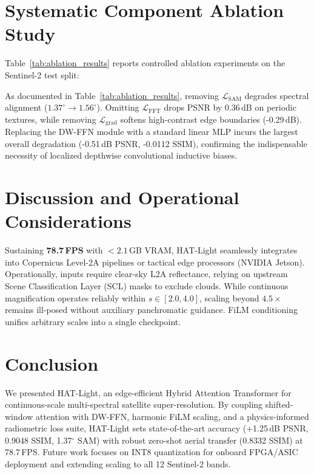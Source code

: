 \documentclass[letterpaper,journal,twoside]{IEEEtran}
\begin{document}
\section{Systematic Component Ablation Study}
Table~\ref{tab:ablation_results} reports controlled ablation experiments on the Sentinel-2 test split:



As documented in Table~\ref{tab:ablation_results}, removing $\mathcal{L}_{\text{SAM}}$ degrades spectral alignment ($1.37^\circ \to 1.56^\circ$). Omitting $\mathcal{L}_{\text{FFT}}$ drops PSNR by 0.36\,dB on periodic textures, while removing $\mathcal{L}_{\text{grad}}$ softens high-contrast edge boundaries (-0.29\,dB). Replacing the DW-FFN module with a standard linear MLP incurs the largest overall degradation (-0.51\,dB PSNR, -0.0112 SSIM), confirming the indispensable necessity of localized depthwise convolutional inductive biases.

\section{Discussion and Operational Considerations}
Sustaining \textbf{78.7\,FPS} with $<2.1$\,GB VRAM, HAT-Light seamlessly integrates into Copernicus Level-2A pipelines or tactical edge processors (NVIDIA Jetson). Operationally, inputs require clear-sky L2A reflectance, relying on upstream Scene Classification Layer (SCL) masks to exclude clouds. While continuous magnification operates reliably within $s \in [2.0, 4.0]$, scaling beyond $4.5\times$ remains ill-posed without auxiliary panchromatic guidance. FiLM conditioning unifies arbitrary scales into a single checkpoint.

\section{Conclusion}
We presented HAT-Light, an edge-efficient Hybrid Attention Transformer for continuous-scale multi-spectral satellite super-resolution. By coupling shifted-window attention with DW-FFN, harmonic FiLM scaling, and a physics-informed radiometric loss suite, HAT-Light sets state-of-the-art accuracy (+1.25\,dB PSNR, 0.9048 SSIM, 1.37$^\circ$ SAM) with robust zero-shot aerial transfer (0.8332 SSIM) at 78.7\,FPS. Future work focuses on INT8 quantization for onboard FPGA/ASIC deployment and extending scaling to all 12 Sentinel-2 bands.

\balance


\end{document}
